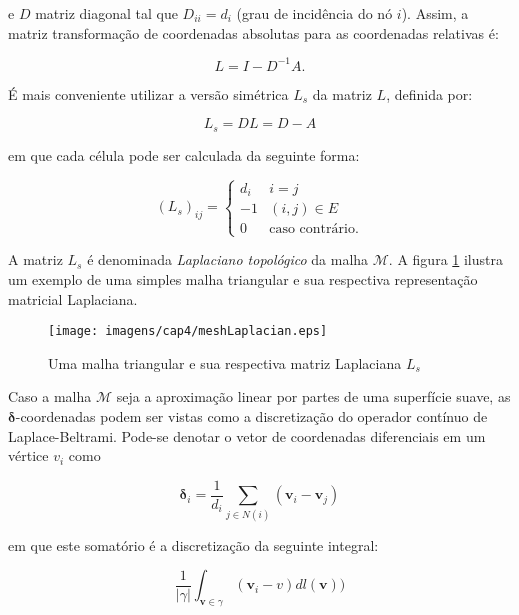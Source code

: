 \noindent e $D$ matriz diagonal tal que $D_{ii} = d_i$ (grau de incidência do nó $i$). Assim, a matriz transformação de coordenadas absolutas para as coordenadas relativas é:

\begin{equation}
L = I - D^{-1}A.
\end{equation}

É mais conveniente utilizar a versão simétrica $L_s$ da matriz $L$, definida por:

\begin{equation}\label{eqMatLaplaciana}
L_s = DL = D - A
\end{equation}

\noindent em que cada célula pode ser calculada da seguinte forma:

\begin{equation}
(L_s)_{ij} = \begin{cases}
d_i&i=j\\
-1&(i, j) \in E\\
0&\text{caso contrário.}
\end{cases}
\end{equation}

A matriz $L_s$ é denominada \textit{Laplaciano topológico} da malha $\mathcal M$. A figura \ref{fig:matrizLaplaciana} ilustra um exemplo de uma simples malha triangular e sua respectiva representação matricial Laplaciana.

\begin{figure}[htb]
	\centering
	\texttt{[image: imagens/cap4/meshLaplacian.eps]}
	\caption{Uma malha triangular e sua respectiva matriz Laplaciana $L_s$ \cite{sorkine2006}}
	\label{fig:matrizLaplaciana}
\end{figure}

Caso a malha $\mathcal{M}$ seja a aproximação linear por partes de uma superfície suave, as $\mathbf{\delta}$-coordenadas podem ser vistas como a discretização do operador contínuo de Laplace-Beltrami. Pode-se denotar o vetor de coordenadas diferenciais em um vértice $v_i$ como

\begin{equation}
\mathbf{\delta}_i = \frac{1}{d_i} \sum_{j \in N(i)} (\mathbf{v}_i - \mathbf{v}_j)
\end{equation}

\noindent em que este somatório é a discretização da seguinte integral:

\begin{equation}
\frac{1}{|\gamma|} \int_{\mathbf{v} \in \gamma} (\mathbf{v}_i - v) dl(\mathbf{v}))
\end{equation}

